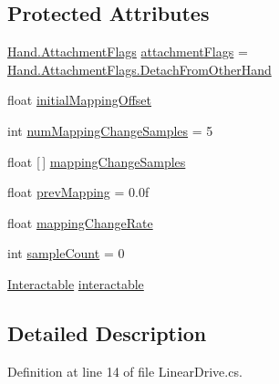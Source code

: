 \subsection*{Protected Attributes}
\begin{DoxyCompactItemize}
\item 
\mbox{\hyperlink{class_valve_1_1_v_r_1_1_interaction_system_1_1_hand_a61701f82b8f3fac8818954ec71804cb5}{Hand.\+Attachment\+Flags}} \mbox{\hyperlink{class_valve_1_1_v_r_1_1_interaction_system_1_1_linear_drive_a6ade301020a7164c3a16d88d90080af5}{attachment\+Flags}} = \mbox{\hyperlink{class_valve_1_1_v_r_1_1_interaction_system_1_1_hand_a61701f82b8f3fac8818954ec71804cb5a8a58e6540a6a37ae53f78af6e282acb2}{Hand.\+Attachment\+Flags.\+Detach\+From\+Other\+Hand}}
\item 
float \mbox{\hyperlink{class_valve_1_1_v_r_1_1_interaction_system_1_1_linear_drive_ab65070c8f4b512ea34283afe5bb4471c}{initial\+Mapping\+Offset}}
\item 
int \mbox{\hyperlink{class_valve_1_1_v_r_1_1_interaction_system_1_1_linear_drive_abf4e8792695528d43eb6ef320d2ffed0}{num\+Mapping\+Change\+Samples}} = 5
\item 
float \mbox{[}$\,$\mbox{]} \mbox{\hyperlink{class_valve_1_1_v_r_1_1_interaction_system_1_1_linear_drive_a9043fc43946ceacb004e078642e51e1e}{mapping\+Change\+Samples}}
\item 
float \mbox{\hyperlink{class_valve_1_1_v_r_1_1_interaction_system_1_1_linear_drive_a806b2e66252d2a23963db8f7d4acc937}{prev\+Mapping}} = 0.\+0f
\item 
float \mbox{\hyperlink{class_valve_1_1_v_r_1_1_interaction_system_1_1_linear_drive_ae175b0d8c891b3052bf26c7d3345fac3}{mapping\+Change\+Rate}}
\item 
int \mbox{\hyperlink{class_valve_1_1_v_r_1_1_interaction_system_1_1_linear_drive_a4eee470e177540a1eb4e301391927090}{sample\+Count}} = 0
\item 
\mbox{\hyperlink{class_valve_1_1_v_r_1_1_interaction_system_1_1_interactable}{Interactable}} \mbox{\hyperlink{class_valve_1_1_v_r_1_1_interaction_system_1_1_linear_drive_a599cc89c5bfc162c2c8967ebc7edfb16}{interactable}}
\end{DoxyCompactItemize}


\subsection{Detailed Description}


Definition at line 14 of file Linear\+Drive.\+cs.



